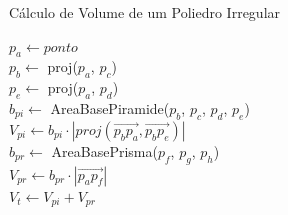 \vspace{1em}
\begin{algorithm}[H]
    \caption{Cálculo de Volume de um Poliedro Irregular}
    \hspace{1em}
     {
         {
            $p_a \leftarrow ponto$ \\
        }
    }
    $p_b \leftarrow$ proj($p_a$, $p_c$) \\
    $p_e \leftarrow$ proj($p_a$, $p_d$) \\
    
    $b_{pi} \leftarrow$ AreaBasePiramide($p_b$, $p_c$, $p_d$, $p_e$) \\
    $V_{pi} \leftarrow b_{pi} \cdot \left | proj(\overrightarrow{p_b p_a}, \overrightarrow{p_b p_e}) \right |$ \\
    $b_{pr} \leftarrow$ AreaBasePrisma($p_f$, $p_g$, $p_h$) \\
    $V_{pr} \leftarrow b_{pr} \cdot \left |\overrightarrow{p_a p_f} \right |$ \\
    $V_t \leftarrow V_{pi} + V_{pr}$ \\
    \label{alg:poly_alg}
    \hspace{1em}
\end{algorithm}
\fi